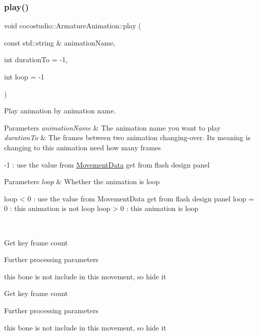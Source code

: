 \subsubsection{\texorpdfstring{play()}{play()}\hspace{0.1cm}{\footnotesize\ttfamily [1/2]}}
{\footnotesize\ttfamily void cocostudio\+::\+Armature\+Animation\+::play (\begin{DoxyParamCaption}\item[{const std\+::string \&}]{animation\+Name,  }\item[{int}]{duration\+To = {\ttfamily -\/1},  }\item[{int}]{loop = {\ttfamily -\/1} }\end{DoxyParamCaption})\hspace{0.3cm}{\ttfamily [virtual]}}

Play animation by animation name.


\begin{DoxyParams}{Parameters}
{\em animation\+Name} & The animation name you want to play \\
\hline
{\em duration\+To} & The frames between two animation changing-\/over. It\textquotesingle{}s meaning is changing to this animation need how many frames\\
\hline
\end{DoxyParams}
-\/1 \+: use the value from \hyperlink{classcocostudio_1_1MovementData}{Movement\+Data} get from flash design panel 
\begin{DoxyParams}{Parameters}
{\em loop} & Whether the animation is loop \begin{DoxyVerb}    loop < 0 : use the value from MovementData get from flash design panel
    loop = 0 : this animation is not loop
    loop > 0 : this animation is loop\end{DoxyVerb}
 \\
\hline
\end{DoxyParams}
Get key frame count

Further processing parameters

this bone is not include in this movement, so hide it

Get key frame count

Further processing parameters

this bone is not include in this movement, so hide it \mbox{\label{classcocostudio_1_1ArmatureAnimation_acb69125e1aa0d255abf7494dd0b5fac3}} 
